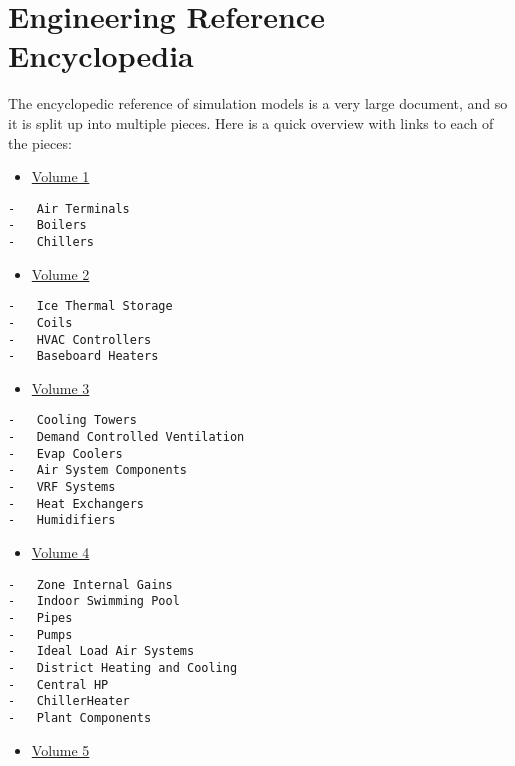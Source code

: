 \chapter{Engineering Reference Encyclopedia}\label{engineering-reference-encyclopedia}

The encyclopedic reference of simulation models is a very large document, and so it is split up into multiple pieces. Here is a quick overview with links to each of the pieces:

\begin{itemize}
\tightlist
\item
  \href{13a-EncyclopaedicRefs.md}{Volume 1}
\end{itemize}

\begin{lstlisting}
-   Air Terminals
-   Boilers
-   Chillers
\end{lstlisting}

\begin{itemize}
\tightlist
\item
  \href{13b-EncyclopaedicRefs.md}{Volume 2}
\end{itemize}

\begin{lstlisting}
-   Ice Thermal Storage
-   Coils
-   HVAC Controllers
-   Baseboard Heaters
\end{lstlisting}

\begin{itemize}
\tightlist
\item
  \href{13c-EncyclopaedicRefs.md}{Volume 3}
\end{itemize}

\begin{lstlisting}
-   Cooling Towers
-   Demand Controlled Ventilation
-   Evap Coolers
-   Air System Components
-   VRF Systems
-   Heat Exchangers
-   Humidifiers
\end{lstlisting}

\begin{itemize}
\tightlist
\item
  \href{13d-EncyclopaedicRefs.md}{Volume 4}
\end{itemize}

\begin{lstlisting}
-   Zone Internal Gains
-   Indoor Swimming Pool
-   Pipes
-   Pumps
-   Ideal Load Air Systems
-   District Heating and Cooling
-   Central HP
-   ChillerHeater
-   Plant Components
\end{lstlisting}

\begin{itemize}
\tightlist
\item
  \href{13e-EncyclopaedicRefs.md}{Volume 5}
\end{itemize}

